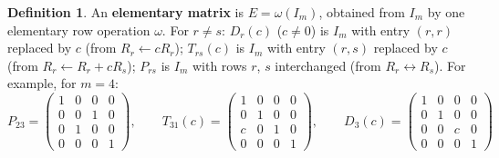 \documentclass[12pt]{article}
\theoremstyle{definition}
\newtheorem{definition}[theorem]{Definition}
\begin{document}
\begin{definition}\label{b2.14}
An \textbf{elementary matrix} is \(E=\omega(I_m)\), obtained from \(I_m\) by one elementary row operation \(\omega\).
For \(r\ne s\): \(D_r(c)\) (\(c\ne0\)) is \(I_m\) with entry \((r,r)\) replaced by \(c\) (from \(R_r\leftarrow cR_r\));
\(T_{rs}(c)\) is \(I_m\) with entry \((r,s)\) replaced by \(c\) (from \(R_r\leftarrow R_r+cR_s\)); \(P_{rs}\) is \(I_m\)
with rows \(r\), \(s\) interchanged (from \(R_r\leftrightarrow R_s\)). For example, for \(m=4\):
\[
P_{23}=\begin{pmatrix}1&0&0&0\\0&0&1&0\\0&1&0&0\\0&0&0&1\end{pmatrix},\qquad
T_{31}(c)=\begin{pmatrix}1&0&0&0\\0&1&0&0\\c&0&1&0\\0&0&0&1\end{pmatrix},\qquad
D_3(c)=\begin{pmatrix}1&0&0&0\\0&1&0&0\\0&0&c&0\\0&0&0&1\end{pmatrix}
\]
\end{definition}
\end{document}
